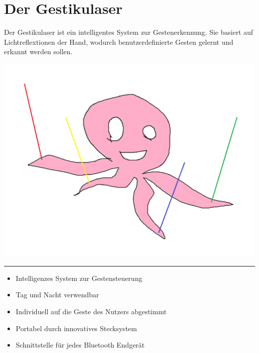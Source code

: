 \documentclass[a4paper,12pt,notumble]{leaflet}
\begin{document}
\newpage
\raggedright

\section{Der Gestikulaser}

Der Gestikulaser ist ein intelligentes System zur Gestenerkennung. Sie basiert auf Lichtreflextionen der Hand, wodurch benutzerdefinierte Gesten gelernt und erkannt werden sollen. 

\begin{flushright}
\includegraphics[scale=0.2]{../Logos/gestikulaser.png}
\end{flushright}

\vspace*{\fill}
\textcolor{rwth-lblue}{\noindent\rule{\textwidth}{4pt}}
\begin{itemize}
\item Intelligenzes System zur Gestensteuerung
\item Tag und Nacht verwendbar
\item Individuell auf die Geste des Nutzers abgestimmt
\item Portabel durch innovatives Stecksystem
\item Schnittstelle für jedes Bluetooth Endgerät
\end{itemize}

\newpage


\end{document}
